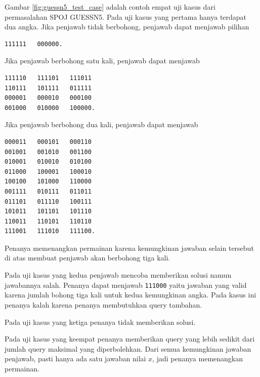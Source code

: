 Gambar \ref{fig:guessn5_test_case} adalah contoh empat uji kasus dari permasalahan SPOJ GUESSN5. Pada uji kasus yang pertama hanya terdapat dua angka. Jika penjawab tidak berbohong, penjawab dapat menjawab pilihan

\begin{center}
\begin{BVerbatim}
111111   000000.
\end{BVerbatim}
\end{center}

\noindent
Jika penjawab berbohong satu kali, penjawab dapat menjawab

\begin{center}
\begin{BVerbatim}
111110   111101   111011
110111   101111   011111
000001   000010   000100
001000   010000   100000.
\end{BVerbatim}
\end{center}

\noindent
Jika penjawab berbohong dua kali, penjawab dapat menjawab

\begin{center}
\begin{BVerbatim}
000011   000101   000110
001001   001010   001100
010001   010010   010100
011000   100001   100010
100100   101000   110000
001111   010111   011011
011101   011110   100111
101011   101101   101110
110011   110101   110110
111001   111010   111100.
\end{BVerbatim}
\end{center}

\noindent
Penanya memenangkan permainan karena kemungkinan jawaban selain tersebut di atas membuat penjawab akan berbohong tiga kali.

Pada uji kasus yang kedua penjawab mencoba memberikan solusi namun jawabannya salah. Penanya dapat menjawab \texttt{111000} yaitu jawaban yang valid karena jumlah bohong tiga kali untuk kedua kemungkinan angka. Pada kasus ini penanya kalah karena penanya membutuhkan query tambahan.

Pada uji kasus yang ketiga penanya tidak memberikan solusi.

Pada uji kasus yang keempat penanya memberikan query yang lebih sedikit dari jumlah query maksimal yang diperbolehkan. Dari semua kemungkinan jawaban penjawab, pasti hanya ada satu jawaban nilai $x$, jadi penanya memenangkan permainan.


